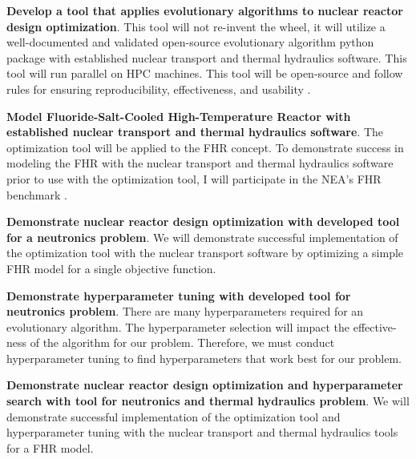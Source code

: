 \noindent
\textbf{Develop a tool that applies evolutionary algorithms to nuclear 
reactor design optimization}. 
This tool will not re-invent the wheel, it will utilize a well-documented 
and validated open-source evolutionary algorithm python package with established 
nuclear transport and thermal hydraulics software. This tool will run parallel on 
\gls{HPC} machines. This tool will be open-source and follow rules for ensuring 
reproducibility, effectiveness, and usability 
\cite{list_ten_2017,osborne_ten_2014,sandve_ten_2013}. 

\vspace{0.2cm} 
\noindent
\textbf{Model Fluoride-Salt-Cooled High-Temperature Reactor with established 
nuclear transport and thermal hydraulics software}.
The optimization tool will be applied to the \gls{FHR} concept. 
To demonstrate success in modeling the \gls{FHR} with the nuclear transport and 
thermal hydraulics software prior to use with the optimization tool, I will participate 
in the \gls{NEA}'s \gls{FHR} benchmark \cite{noauthor_fluoride_nodate}. 

\vspace{0.2cm} 
\noindent
\textbf{Demonstrate nuclear reactor design optimization with developed tool 
for a neutronics problem}. 
We will demonstrate successful implementation of the optimization tool with the 
nuclear transport software by optimizing a simple \gls{FHR} model for a single 
objective function. 

\vspace{0.2cm} 
\noindent
\textbf{Demonstrate hyperparameter tuning with developed tool for neutronics problem}.
There are many hyperparameters required for an evolutionary algorithm. 
The hyperparameter selection will impact the effective-ness of the algorithm 
for our problem. 
Therefore, we must conduct hyperparameter tuning to find hyperparameters that work 
best for our problem. 

\vspace{0.2cm} 
\noindent
\textbf{Demonstrate nuclear reactor design optimization and hyperparameter 
search with tool for neutronics and thermal hydraulics problem}.
We will demonstrate successful implementation of the optimization tool and 
hyperparameter tuning with the nuclear transport and thermal hydraulics tools 
for a \gls{FHR} model.  


